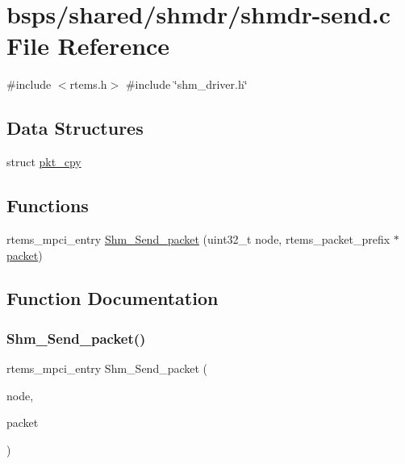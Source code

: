 \hypertarget{shmdr-send_8c}{}\section{bsps/shared/shmdr/shmdr-\/send.c File Reference}
\label{shmdr-send_8c}
{\ttfamily \#include $<$rtems.\+h$>$}\newline
{\ttfamily \#include \char`\"{}shm\+\_\+driver.\+h\char`\"{}}\newline
\subsection*{Data Structures}
\begin{DoxyCompactItemize}
\item 
struct \mbox{\hyperlink{structpkt__cpy}{pkt\+\_\+cpy}}
\end{DoxyCompactItemize}
\subsection*{Functions}
\begin{DoxyCompactItemize}
\item 
rtems\+\_\+mpci\+\_\+entry \mbox{\hyperlink{shmdr-send_8c_a3677117b4ee8fb82f89338879e754fa5}{Shm\+\_\+\+Send\+\_\+packet}} (uint32\+\_\+t node, rtems\+\_\+packet\+\_\+prefix $\ast$\mbox{\hyperlink{structpacket}{packet}})
\end{DoxyCompactItemize}


\subsection{Function Documentation}
\mbox{\label{shmdr-send_8c_a3677117b4ee8fb82f89338879e754fa5}} 
\subsubsection{\texorpdfstring{Shm\_Send\_packet()}{Shm\_Send\_packet()}}
{\footnotesize\ttfamily rtems\+\_\+mpci\+\_\+entry Shm\+\_\+\+Send\+\_\+packet (\begin{DoxyParamCaption}\item[{uint32\+\_\+t}]{node,  }\item[{rtems\+\_\+packet\+\_\+prefix $\ast$}]{packet }\end{DoxyParamCaption})}

